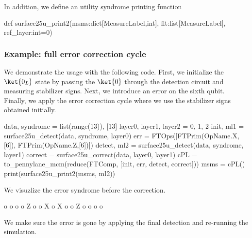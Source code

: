 \li In addition, we define an utility syndrome printing function

  \begin{python}
  def surface25u_print2(msms:dict[MeasureLabel,int], flt:list[MeasureLabel], ref_layer:int=0)
  \end{python}

\le

\subsubsection{Example: full error correction cycle}

We demonstrate the usage with the following code. First, we initialize the $\ket{0_L}$ state by
passing the $\ket{0}$ through the detection circuit and measuring stabilizer signs. Next, we
introduce an error on the sixth qubit. Finally, we apply the error correction cycle where we use the
stabilizer signs obtained initially.

  \begin{python}
  data, syndrome = list(range(13)), [13]
  layer0, layer1, layer2 = 0, 1, 2
  init, ml1 = surface25u_detect(data, syndrome, layer0)
  err = FTOps([FTPrim(OpName.X,[6]),
               FTPrim(OpName.Z,[6])])
  detect, ml2 = surface25u_detect(data, syndrome, layer1)
  correct = surface25u_correct(data, layer0, layer1)
  cPL = to_pennylane_mcm(reduce(FTComp, [init, err, detect, correct]))
  msms = cPL()
  print(surface25u_print2(msms, ml2))
  \end{python}

We visuzlize the error syndrome before the correction.

  \begin{result}

  o   o   o
    o Z o 
  o X o X o
    o Z o 
  o   o   o

  \end{result}

We make sure the error is gone by applying the final detection and re-running the simulation.

